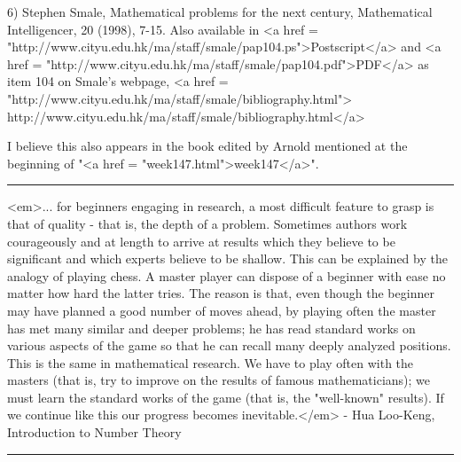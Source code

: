6) Stephen Smale, Mathematical problems for the next century,
Mathematical Intelligencer, 20 (1998), 7-15.  Also available 
in 
<a href = "http://www.cityu.edu.hk/ma/staff/smale/pap104.ps">Postscript</a>
and 
<a href = "http://www.cityu.edu.hk/ma/staff/smale/pap104.pdf">PDF</a> 
as item 104 on Smale's webpage,
<a href = "http://www.cityu.edu.hk/ma/staff/smale/bibliography.html">
http://www.cityu.edu.hk/ma/staff/smale/bibliography.html</a>

I believe this also appears in the book edited by Arnold mentioned
at the beginning of "<a href = "week147.html">week147</a>".




 \par\noindent\rule{\textwidth}{0.4pt}
<em>... for beginners engaging in research, a most difficult
feature to grasp is that of quality - that is, the depth of a
problem.  Sometimes authors work courageously and at length to
arrive at results which they believe to be significant and which
experts believe to be shallow. This can be explained by the analogy
of playing chess.  A master player can dispose of a beginner with
ease no matter how hard the latter tries.  The reason is that, even
though the beginner may have planned a good number of moves ahead, by
playing often the master has met many similar and deeper problems;
he has read standard works on various aspects of the game so that
he can recall many deeply analyzed positions.  This is the same in
mathematical research.  We have to play often with the masters
(that is, try to improve on the results of famous mathematicians);
we must learn the standard works of the game (that is, the "well-known"
results).  If we continue like this our progress becomes inevitable.</em> -
Hua Loo-Keng, Introduction to Number Theory

\par\noindent\rule{\textwidth}{0.4pt}

